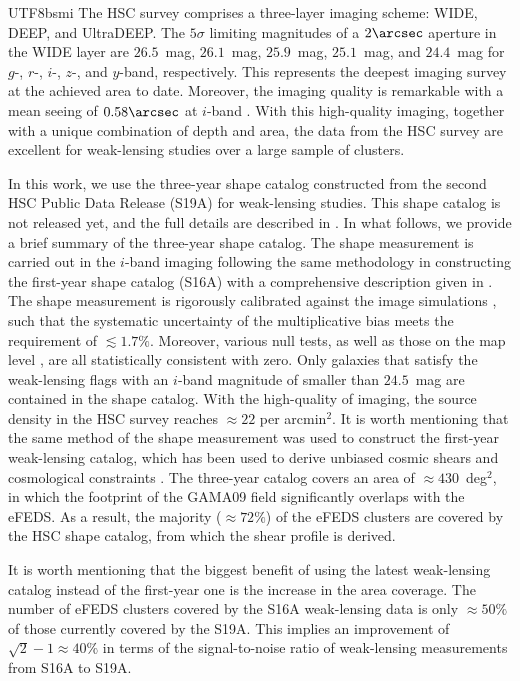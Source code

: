 \documentclass[longauth]{aa}
\newcommand{\percent}{\ensuremath{\%}}
\begin{document}
\begin{CJK*}{UTF8}{bsmi}
The HSC survey comprises a three-layer imaging scheme: WIDE, DEEP, and UltraDEEP.
The $5\sigma$ limiting magnitudes of a $2\arcsec$ aperture in the WIDE layer are $26.5$~mag, $26.1$~mag, $25.9$~mag, $25.1$~mag, and $24.4$~mag for $g$-, $r$-, $i$-, $z$-, and $y$-band, respectively.
This represents the deepest imaging survey at the achieved area to date.
Moreover, the imaging quality is remarkable with a mean seeing of $0.58\arcsec$ at $i$-band \citep{mandelbaum18}.
With this high-quality imaging, together with a unique combination of depth and area, the data from the HSC survey are excellent for weak-lensing studies over a large sample of clusters.


In this work, we use the three-year shape catalog constructed from the second HSC Public Data Release (S19A) for weak-lensing studies.
This shape catalog is not released yet, and the full details are described in \cite{li21}.
In what follows, we provide a brief summary of the three-year shape catalog.
The shape measurement is carried out in the $i$-band imaging following the same methodology in constructing the first-year shape catalog (S16A) with a comprehensive description given in \cite{mandelbaum18}.
The shape measurement is rigorously calibrated against the image simulations \citep{mandelbaum18b}, such that the systematic uncertainty of the multiplicative bias meets the requirement of $\lesssim1.7\percent$.
Moreover, various null tests, as well as those on the map level \citep{oguri18b}, are all statistically consistent with zero.
Only galaxies that satisfy the weak-lensing flags with an $i$-band magnitude of smaller than $24.5$~mag are contained in the shape catalog.
With the high-quality of imaging, the source density in the HSC survey reaches $\approx22$ per arcmin$^2$.
It is worth mentioning that the same method of the shape measurement was used to construct the first-year weak-lensing catalog, which has been used to derive unbiased cosmic shears and cosmological constraints \citep{hikage19,hamana20}.
The three-year catalog covers an area of $\approx430$~deg$^2$, in which the footprint of the GAMA09 field significantly overlaps with the eFEDS.
As a result, the majority ($\approx72\percent$) of the eFEDS clusters are covered by the HSC shape catalog, from which the shear profile is derived.


It is worth mentioning that the biggest benefit of using the latest weak-lensing catalog instead of the first-year one is the increase in  the area coverage.
The number of eFEDS clusters covered by the S16A weak-lensing data is only $\approx50\percent$ of those currently covered by the S19A.
This implies an improvement of $\sqrt{2} -1 \approx 40\percent$ in terms of the signal-to-noise ratio of weak-lensing measurements from S16A to S19A.






\end{CJK*}
\end{document}
